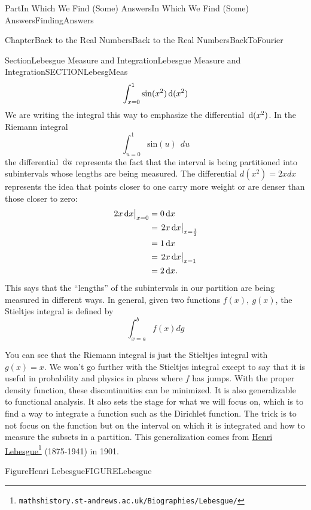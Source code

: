\documentclass[oneside,10pt,]{book}
\numberwithin{equation}{part}
\newcommand{\dx}[1]{\,{\rm d}#1}
\def\mineval#1#2{\left.\strut{}#1\right|_{#2}}
\newcommand{\amp}{&}
\begin{document}
\begin{partptx}{Part}{In Which We Find (Some) Answers}{}{In Which We Find (Some) Answers}{}{}{FindingAnswers}
\begin{chapterptx}{Chapter}{Back to the Real Numbers}{}{Back to the Real Numbers}{}{}{BackToFourier}
\begin{sectionptx}{Section}{Lebesgue Measure and Integration}{}{Lebesgue Measure and Integration}{}{}{SECTIONLebesgMeas}
\begin{equation*}
\int^1_{x=0}{\sin(x^2)} \dx(x^2)
\end{equation*}
We are writing the integral this way to emphasize the differential \(\dx{(x^2)}\). In the Riemann integral%
\begin{equation*}
\int^1_{u=0}{{\mathrm{sin}
\left(u\right)\ }\ du}
\end{equation*}
the differential \(\dx{u}\) represents the fact that the interval is being partitioned into subintervals whose lengths are being measured.  The differential \(d\left(x^2\right)=2xdx\) represents the idea that points closer to one carry more weight or are denser than those closer to zero:%
\begin{align*}
\mineval{2x\dx{x}}{x=0}\amp{}=0\dx{x}\\
\amp{}=\mineval{2x\dx{x}}{x=\frac12}\\
\amp{}=1 \dx{x}\\
\amp{}=\mineval{2x\dx{x}}{x=1}\\
\amp{}=2 \dx{x}.
\end{align*}
This says that the ``lengths'' of the subintervals in our partition are being measured in different ways.  In general, given two functions \(f\left(x\right),\ g(x)\), the Stieltjes integral is defined by%
\begin{equation*}
\int^b_{x=a}{f\left(x\right)dg}
\end{equation*}
%
\par
You can see that the Riemann integral is just the Stieltjes integral with \(g\left(x\right)=x\).  We won't go further with the Stieltjes integral except to say that it is useful in probability and physics in places where \(f\) has jumps. With the proper density function, these discontinuities can be minimized.  It is also generalizable to functional analysis. It also sets the stage for what we will focus on, which is to find a way to integrate a function such as the Dirichlet function.  The trick is to not focus on the function but on the interval on which it is integrated and how to measure the subsets in a partition.  This generalization comes from \href{https://mathshistory.st-andrews.ac.uk/Biographies/Lebesgue/}{Henri Lebesgue}\footnote{\nolinkurl{mathshistory.st-andrews.ac.uk/Biographies/Lebesgue/}\label{SECTIONLebesgMeas-5-4}} (1875-1941) in 1901.%
\begin{figureptx}{Figure}{Henri Lebesgue}{FIGURELebesgue}{}%
\begin{image}{0.3}{0.4}{0.3}{}%

\end{image}
\end{figureptx}
\end{sectionptx}
\end{chapterptx}
\end{partptx}
\end{document}
